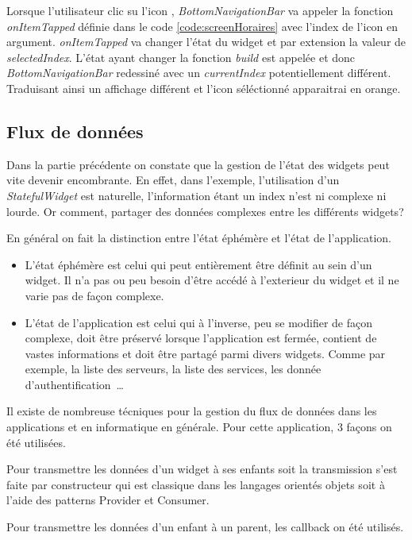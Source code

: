 Lorsque l'utilisateur clic su l'icon , \textit{BottomNavigationBar} va appeler la fonction \textit{onItemTapped} définie dans le code \ref{code:screenHoraires} avec
l'index de l'icon en argument. \textit{onItemTapped} va changer l'état du widget et par extension la valeur de \textit{selectedIndex}. L'état ayant changer la fonction
\textit{build} est appelée et donc \textit{BottomNavigationBar} redessiné avec un \textit{currentIndex} potentiellement différent. Traduisant ainsi
un affichage différent et l'icon séléctionné apparaitrai en orange.

\subsection{Flux de données}
Dans la partie précédente on constate que la gestion de l'état des widgets peut vite devenir encombrante. En effet, dans l'exemple,
l'utilisation d'un \textit{StatefulWidget} est naturelle, l'information étant un index n'est ni complexe ni lourde. Or comment, partager des
données complexes entre les différents widgets?

En général on fait la distinction entre l'état éphémère et l'état de l'application.
\smallskip
\begin{itemize}
    \item L'état éphémère est celui qui peut entièrement être définit au sein d'un widget. Il n'a pas ou peu besoin d'être
          accédé à l'exterieur du widget et il ne varie pas de façon complexe.
    \item L'état de l'application est celui qui à l'inverse, peu se modifier de façon complexe, doit être préservé lorsque l'application est fermée,
          contient de vastes informations et doit être partagé parmi divers widgets. Comme par exemple, la liste des serveurs, la liste des services, les
          donnée d'authentification~\dots
\end{itemize}

Il existe de nombreuse técniques pour la gestion du flux de données dans les applications et en informatique en générale. Pour cette application, 3 façons
on été utilisées.

Pour transmettre les données d'un widget à ses enfants soit la transmission s'est faite par constructeur qui est classique dans les langages orientés
objets soit à l'aide des patterns Provider et Consumer.

Pour transmettre les données d'un enfant à un parent, les callback on été utilisés.

